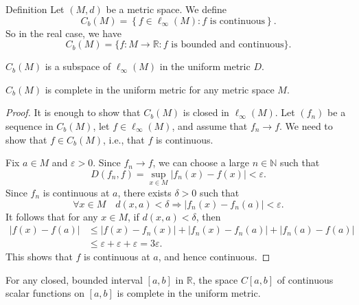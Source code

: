 \documentclass[a4paper]{article}
\begin{document}
\begin{definition}
    Definition Let $(M, d)$ be a metric space. We define
    \[
    C_b(M)=\left\{f \in \ell_{\infty}(M): f \text { is continuous}\right\}.
    \]
    So in the real case, we have
    \[
    C_b(M)=\{f: M \rightarrow \mathbb{R}: f \text { is bounded and continuous}\}.
    \]
\end{definition}

\begin{note}
    $C_b(M)$ is a subspace of $\ell_{\infty}(M)$ in the uniform metric $D$.
\end{note}

\begin{theorem}
    $C_b(M)$ is complete in the uniform metric for any metric space $M$.
\end{theorem}

\begin{proof}
    It is enough to show that $C_b(M)$ is closed in $\ell_{\infty}(M)$. Let $\left(f_n\right)$ be a sequence in $C_b(M)$, let $f \in \ell_{\infty}(M)$, and assume that $f_n \rightarrow f$. We need to show that $f \in C_b(M)$, i.e., that $f$ is continuous. 
    
    Fix $a \in M$ and $\varepsilon>0$. Since $f_n \rightarrow f$, we can choose a large $n \in \mathbb{N}$ such that
    \[
    D\left(f_n, f\right)=\sup _{x \in M}\left|f_n(x)-f(x)\right|<\varepsilon.
    \]
    Since $f_n$ is continuous at $a$, there exists $\delta>0$ such that
    \[
    \forall x \in M \quad d(x, a)<\delta \Longrightarrow\left|f_n(x)-f_n(a)\right|<\varepsilon.
    \]
    It follows that for any $x \in M$, if $d(x, a)<\delta$, then
    \[
    \begin{aligned}
    |f(x)-f(a)| & \leqslant\left|f(x)-f_n(x)\right|+\left|f_n(x)-f_n(a)\right|+\left|f_n(a)-f(a)\right| \\
    & \leqslant \varepsilon+\varepsilon+\varepsilon=3 \varepsilon.
    \end{aligned}
    \]
    This shows that $f$ is continuous at $a$, and hence continuous.
\end{proof}

\begin{corollary}
    For any closed, bounded interval $[a, b]$ in $\mathbb{R}$, the space $C[a, b]$ of continuous scalar functions on $[a, b]$ is complete in the uniform metric.
\end{corollary}
\end{document}

